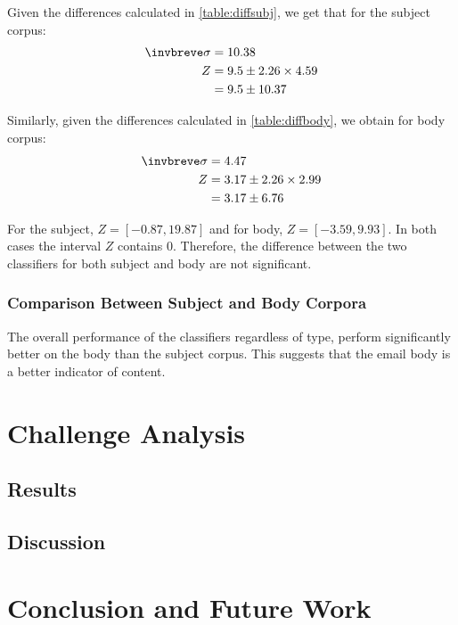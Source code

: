 \documentclass[10pt, a4paper]{article}
\begin{document}
Given the differences calculated in \autoref{table:diffsubj}, we get that for the subject corpus:
\begin{align*}
\invbreve\sigma &= 10.38 \\
Z &= 9.5 \pm 2.26 \times 4.59 \\ &= 9.5 \pm 10.37
\end{align*}

Similarly, given the differences calculated in \autoref{table:diffbody}, we obtain for body corpus:
\begin{align*}
\invbreve\sigma &= 4.47 \\
Z &= 3.17 \pm 2.26 \times 2.99 \\ &= 3.17 \pm 6.76
\end{align*}

For the subject, $Z = [-0.87, 19.87]$ and for body, $Z = [-3.59, 9.93]$. In both cases the interval $Z$ contains 0. Therefore, the difference between the two classifiers for both subject and body are not significant.

\subsubsection{Comparison Between Subject and Body Corpora}

The overall performance of the classifiers regardless of type, perform significantly better on the body than the subject corpus. This suggests that the email body is a better indicator of content.

\section{Challenge Analysis}


\subsection{Results}

\subsection{Discussion}

\section{Conclusion and Future Work}
\end{document}
